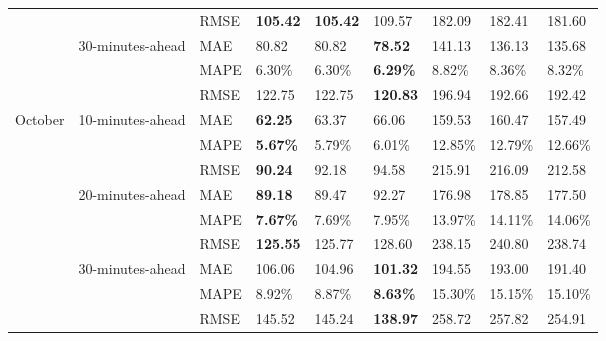 {\begin{longtable}{lllllllll}
 &                                   & RMSE & \textbf{105.42}  & \textbf{105.42}    & 109.57            & 182.09    & 182.41      & 181.60     \\ \cline{2-9}
 & {30-minutes-ahead} & MAE  & 80.82            & 80.82              & \textbf{78.52}    & 141.13    & 136.13      & 135.68     \\
 &                                   & MAPE & 6.30\%           & 6.30\%             & \textbf{6.29\%}   & 8.82\%    & 8.36\%      & 8.32\%     \\
 &                                   & RMSE & 122.75           & 122.75             & \textbf{120.83}   & 196.94    & 192.66      & 192.42     \\ \hline
{October}   & {10-minutes-ahead}    & MAE                       & \textbf{62.25} & 63.37          & 66.06 & 159.53 & 160.47 & 157.49 \\
 &                                   & MAPE & \textbf{5.67\%}  & 5.79\%             & 6.01\%            & 12.85\%   & 12.79\%     & 12.66\%    \\
 &                                   & RMSE & \textbf{90.24}   & 92.18              & 94.58             & 215.91    & 216.09      & 212.58     \\ \cline{2-9}
 & {20-minutes-ahead} & MAE  & \textbf{89.18}   & 89.47              & 92.27             & 176.98    & 178.85      & 177.50     \\
 &                                   & MAPE & \textbf{7.67\%}  & 7.69\%             & 7.95\%            & 13.97\%   & 14.11\%     & 14.06\%    \\
 &                                   & RMSE & \textbf{125.55}  & 125.77             & 128.60            & 238.15    & 240.80      & 238.74     \\ \cline{2-9}
 & {30-minutes-ahead} & MAE  & 106.06           & 104.96             & \textbf{101.32}   & 194.55    & 193.00      & 191.40     \\
 &                                   & MAPE & 8.92\%           & 8.87\%             & \textbf{8.63\%}   & 15.30\%   & 15.15\%     & 15.10\%    \\
 &                                   & RMSE & 145.52           & 145.24             & \textbf{138.97}   & 258.72    & 257.82      & 254.91     \\ \hline
\end{longtable}
}